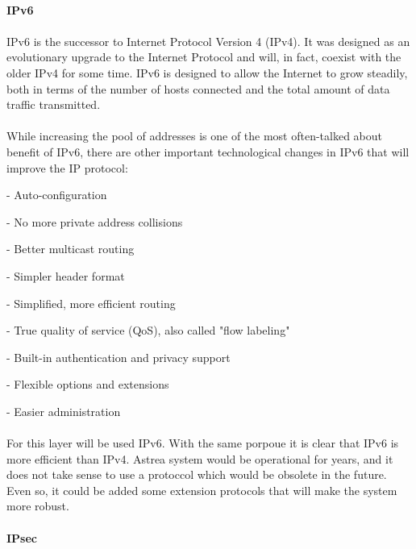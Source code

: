 \paragraph{} \textbf{IPv6}
\paragraph{}
IPv6 is the successor to Internet Protocol Version 4 (IPv4). It was designed as an evolutionary upgrade to the Internet Protocol and will, in fact, coexist with the older IPv4 for some time. IPv6 is designed to allow the Internet to grow steadily, both in terms of the number of hosts connected and the total amount of data traffic transmitted.
\paragraph{}
While increasing the pool of addresses is one of the most often-talked about benefit of IPv6, there are other important technological changes in IPv6 that will improve the IP protocol:
\begin{list}{}{}
\item - Auto-configuration
\item - No more private address collisions
\item - Better multicast routing
\item - Simpler header format
\item - Simplified, more efficient routing
\item - True quality of service (QoS), also called "flow labeling"
\item - Built-in authentication and privacy support
\item - Flexible options and extensions
\item - Easier administration 
\end{list}

\paragraph{}
For this layer will be used IPv6. With the same porpoue it is clear that IPv6 is more efficient than IPv4. Astrea system would be operational for years, and it does not take sense to use a protoccol which would be obsolete in the future. Even so, it could be added some extension protocols that will make the system more robust.

\paragraph{} \textbf{IPsec}
